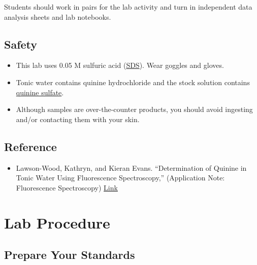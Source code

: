 \documentclass[]{tufte-book}
\providecommand{\tightlist}{%
  \setlength{\itemsep}{0pt}\setlength{\parskip}{0pt}}
\begin{document}
Students should work in pairs for the lab activity and turn in independent data analysis sheets and lab notebooks.

\hypertarget{safety}{%
\subsection*{Safety}\label{safety}}

\begin{itemize}
\tightlist
\item
  This lab uses 0.05 M sulfuric acid (\href{https://beta-static.fishersci.com/content/dam/fishersci/en_US/documents/programs/education/regulatory-documents/sds/chemicals/chemicals-s/S25895.pdf}{SDS}). Wear goggles and gloves.
\item
  Tonic water contains quinine hydrochloride and the stock solution contains \href{https://beta-static.fishersci.com/content/dam/fishersci/en_US/documents/programs/education/regulatory-documents/sds/chemicals/chemicals-q/S25510A.pdf}{quinine sulfate}.
\item
  Although samples are over-the-counter products, you should avoid ingesting and/or contacting them with your skin.
\end{itemize}

\hypertarget{reference}{%
\subsection*{Reference}\label{reference}}

\begin{itemize}
\tightlist
\item
  Lawson-Wood, Kathryn, and Kieran Evans. ``Determination of Quinine
  in Tonic Water Using Fluorescence Spectroscopy,'' (Application Note: Fluorescence Spectroscopy) \href{https://www.perkinelmer.com/lab-solutions/resources/docs/APP_Quinine_in_Tonic_Water_014133_01.pdf}{Link}
\end{itemize}

\newpage

\hypertarget{uv-vis-procedure}{%
\section{Lab Procedure}\label{uv-vis-procedure}}

\hypertarget{prepare-your-standards}{%
\subsection{Prepare Your Standards}\label{prepare-your-standards}}
\end{document}
